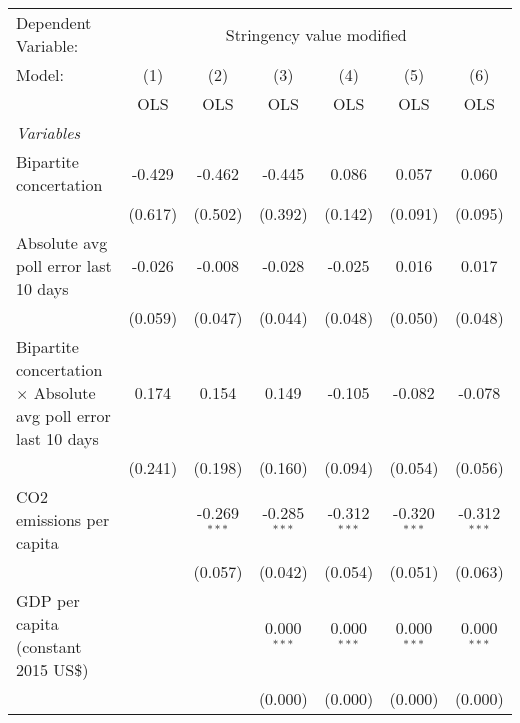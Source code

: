 
\begingroup
\centering
\begin{tabular}{lcccccc}
   \toprule
   Dependent Variable: & \multicolumn{6}{c}{Stringency value modified}\\
   Model:                                                                & (1)     & (2)            & (3)            & (4)            & (5)            & (6)\\  
                                                                         &  OLS    & OLS            & OLS            & OLS            & OLS            & OLS\\  
   \midrule
   \emph{Variables}\\
   Bipartite concertation                                                & -0.429  & -0.462         & -0.445         & 0.086          & 0.057          & 0.060\\   
                                                                         & (0.617) & (0.502)        & (0.392)        & (0.142)        & (0.091)        & (0.095)\\   
   Absolute avg poll error last 10 days                                  & -0.026  & -0.008         & -0.028         & -0.025         & 0.016          & 0.017\\   
                                                                         & (0.059) & (0.047)        & (0.044)        & (0.048)        & (0.050)        & (0.048)\\   
   Bipartite concertation $\times$ Absolute avg poll error last 10 days  & 0.174   & 0.154          & 0.149          & -0.105         & -0.082         & -0.078\\   
                                                                         & (0.241) & (0.198)        & (0.160)        & (0.094)        & (0.054)        & (0.056)\\   
   CO2 emissions per capita                                              &         & -0.269$^{***}$ & -0.285$^{***}$ & -0.312$^{***}$ & -0.320$^{***}$ & -0.312$^{***}$\\   
                                                                         &         & (0.057)        & (0.042)        & (0.054)        & (0.051)        & (0.063)\\   
   GDP per capita (constant 2015 US\$)                                   &         &                & 0.000$^{***}$  & 0.000$^{***}$  & 0.000$^{***}$  & 0.000$^{***}$\\   
                                                                         &         &                & (0.000)        & (0.000)        & (0.000)        & (0.000)\\   

\end{tabular}
